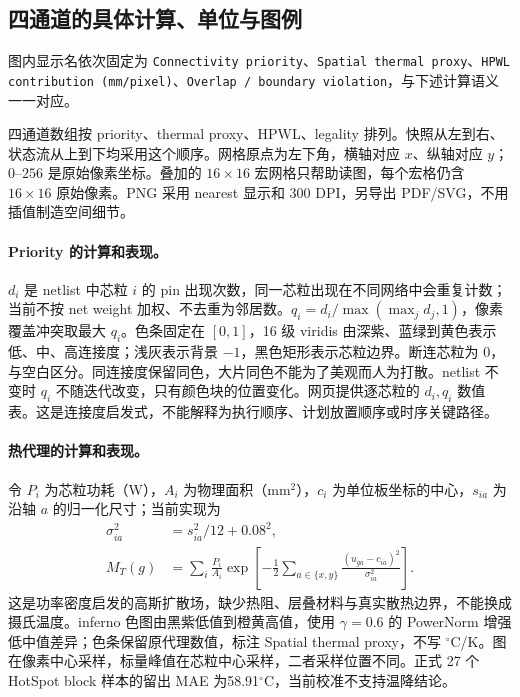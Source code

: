 \documentclass[UTF8,a4paper,11pt]{ctexart}
\newcommand{\code}[1]{\texttt{#1}}
\begin{document}
\subsection{四通道的具体计算、单位与图例}

图内显示名依次固定为 \code{Connectivity priority}、\code{Spatial thermal proxy}、\code{HPWL contribution (mm/pixel)}、\code{Overlap / boundary violation}，与下述计算语义一一对应。

四通道数组按 priority、thermal proxy、HPWL、legality 排列。快照从左到右、状态流从上到下均采用这个顺序。网格原点为左下角，横轴对应 $x$、纵轴对应 $y$；$0$--$256$ 是原始像素坐标。叠加的 $16\times16$ 宏网格只帮助读图，每个宏格仍含 $16\times16$ 原始像素。PNG 采用 nearest 显示和 300 DPI，另导出 PDF/SVG，不用插值制造空间细节。

\paragraph{Priority 的计算和表现。} $d_i$ 是 netlist 中芯粒 $i$ 的 pin 出现次数，同一芯粒出现在不同网络中会重复计数；当前不按 net weight 加权、不去重为邻居数。$q_i=d_i/\max(\max_j d_j,1)$，像素覆盖冲突取最大 $q_i$。色条固定在 $[0,1]$，16 级 viridis 由深紫、蓝绿到黄色表示低、中、高连接度；浅灰表示背景 $-1$，黑色矩形表示芯粒边界。断连芯粒为 $0$，与空白区分。同连接度保留同色，大片同色不能为了美观而人为打散。netlist 不变时 $q_i$ 不随迭代改变，只有颜色块的位置变化。网页提供逐芯粒的 $d_i,q_i$ 数值表。这是连接度启发式，不能解释为执行顺序、计划放置顺序或时序关键路径。

\paragraph{热代理的计算和表现。} 令 $P_i$ 为芯粒功耗（W），$A_i$ 为物理面积（mm$^2$），$c_i$ 为单位板坐标的中心，$s_{ia}$ 为沿轴 $a$ 的归一化尺寸；当前实现为
\begin{equation}
\begin{aligned}
\sigma_{ia}^2&=s_{ia}^2/12+0.08^2,\\
M_T(g)&=\sum_i\frac{P_i}{A_i}
\exp\!\left[-\frac12\sum_{a\in\{x,y\}}
\frac{(u_{ga}-c_{ia})^2}{\sigma_{ia}^2}\right].
\end{aligned}
\end{equation}
这是功率密度启发的高斯扩散场，缺少热阻、层叠材料与真实散热边界，不能换成摄氏温度。inferno 色图由黑紫低值到橙黄高值，使用 $\gamma=0.6$ 的 PowerNorm 增强低中值差异；色条保留原代理数值，标注 Spatial thermal proxy，不写 $^\circ$C/K。图在像素中心采样，标量峰值在芯粒中心采样，二者采样位置不同。正式 27 个 HotSpot block 样本的留出 MAE 为58.91$^\circ$C，当前校准不支持温降结论。
\end{document}

